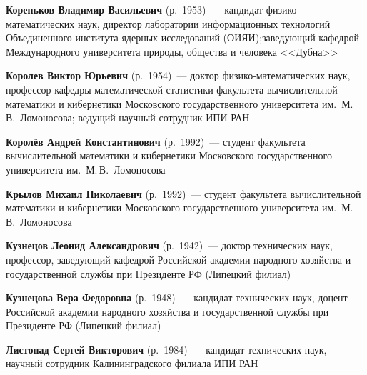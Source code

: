\begin{multicols}{2}
\vspace*{4pt}

\noindent
\textbf{Кореньков Владимир Васильевич} (р.\ 1953)~--- кандидат фи\-зи\-ко-ма\-те\-ма\-ти\-че\-ских наук, 
директор лаборатории информационных технологий Объединенного института ядерных 
исследований (ОИЯИ);\linebreak заведующий кафедрой Международного университета природы, 
общества и человека <<Дубна>> 

\vspace*{4pt}

\noindent
\textbf{Королев Виктор Юрьевич} (р.\ 1954)~--- доктор фи\-зи\-ко-ма\-те\-ма\-ти\-че\-ских наук, 
профессор кафедры математической статистики факультета вычислительной 
математики и кибернетики Московского государст\-венного университета им.\ М.\,В.~Ломоносова; 
ведущий научный сотрудник ИПИ РАН

\vspace*{4pt}

\noindent
\textbf{Королёв Андрей Константинович}  (р.\ 1992)~--- студент факультета вычислительной 
математики и кибернетики Московского государственного университета им.\ М.\,В.~Ломоносова

\vspace*{4pt}

\noindent
\textbf{Крылов Михаил Николаевич}  (р.\ 1992)~--- студент факультета вычислительной 
математики и кибернетики Московского государственного университета им.\ М.\,В.~Ломоносова


\vspace*{4pt}

\noindent
\textbf{Кузнецов Леонид Александрович} (р.\ 1942)~--- доктор технических наук, профессор, 
заведующий ка\-фед\-рой Российской академии народного хозяйства и государственной 
службы при Президенте РФ (Липецкий филиал) 

\vspace*{4pt}

\noindent
\textbf{Кузнецова Вера Федоровна} (р.\ 1948)~--- кандидат технических наук, доцент 
Российской академии народного хозяйства и государственной службы при Президенте 
РФ (Липецкий филиал)





\pagebreak

\def\leftkol{ОБ АВТОРАХ}
\def\rightkol{ОБ АВТОРАХ}

\noindent
\textbf{Листопад Сергей Викторович} (р.\ 1984)~--- кандидат технических наук, научный 
сотрудник Калининградского филиала ИПИ РАН


\end{multicols}
